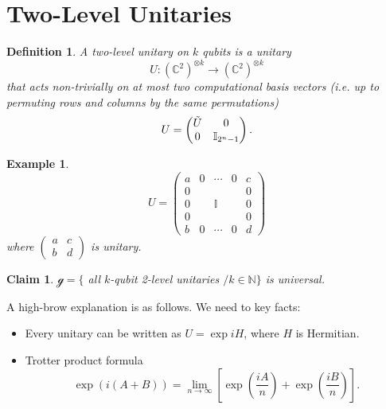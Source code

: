 \documentclass{article}
\newtheorem*{dfn}{Definition}
\newtheorem*{claim}{Claim}
\newtheorem*{example}{Example}
\begin{document}
\section{Two-Level Unitaries}
    \begin{dfn}
        A two-level unitary on $k$ qubits is a unitary
        \begin{equation*}
            U: \left( \mathbb{C} ^2 \right)^{\otimes k} \rightarrow \left( \mathbb{C} ^2 \right)^{\otimes k}
        \end{equation*}
        that acts non-trivially on at most two computational basis vectors (i.e. up to permuting rows and columns by the same permutations)
        \begin{equation*}
            U = 
            \begin{pmatrix}
                \Tilde{U} & 0 \\
                0 & \mathbb{I}_{2^n - 1}
            \end{pmatrix}.
        \end{equation*}
    \end{dfn}

    \begin{example}
        \begin{equation*}
            U = 
            \begin{pmatrix}
                a & 0 & \cdots & 0 & c \\
                0 &&&& 0 \\
                0 && \mathbb{I} && 0 \\
                 0 &&&& 0 \\
                b & 0 & \cdots & 0 & d 
            \end{pmatrix}
        \end{equation*}
        where $\begin{pmatrix}
            a & c \\
            b & d
        \end{pmatrix}$ is unitary.
    \end{example}


    \begin{claim}
        $\mathcal{g} = \{ $ all $k$-qubit 2-level unitaries $/ k \in \mathbb{N} \}$ is universal.
    \end{claim}

    A high-brow explanation is as follows. We need to key facts:
    \begin{itemize}
        \item 
        Every unitary can be written as $U = \exp{iH}$, where $H$ is Hermitian.

        \item 
        Trotter product formula
        \begin{equation*}
            \exp{(i \left( A + B \right))} = \lim_{n \rightarrow \infty} \left[ \exp{\left( \frac{iA}{n} \right)} + \exp{\left( \frac{iB}{n} \right)} \right].
        \end{equation*}
    \end{itemize}
\end{document}
